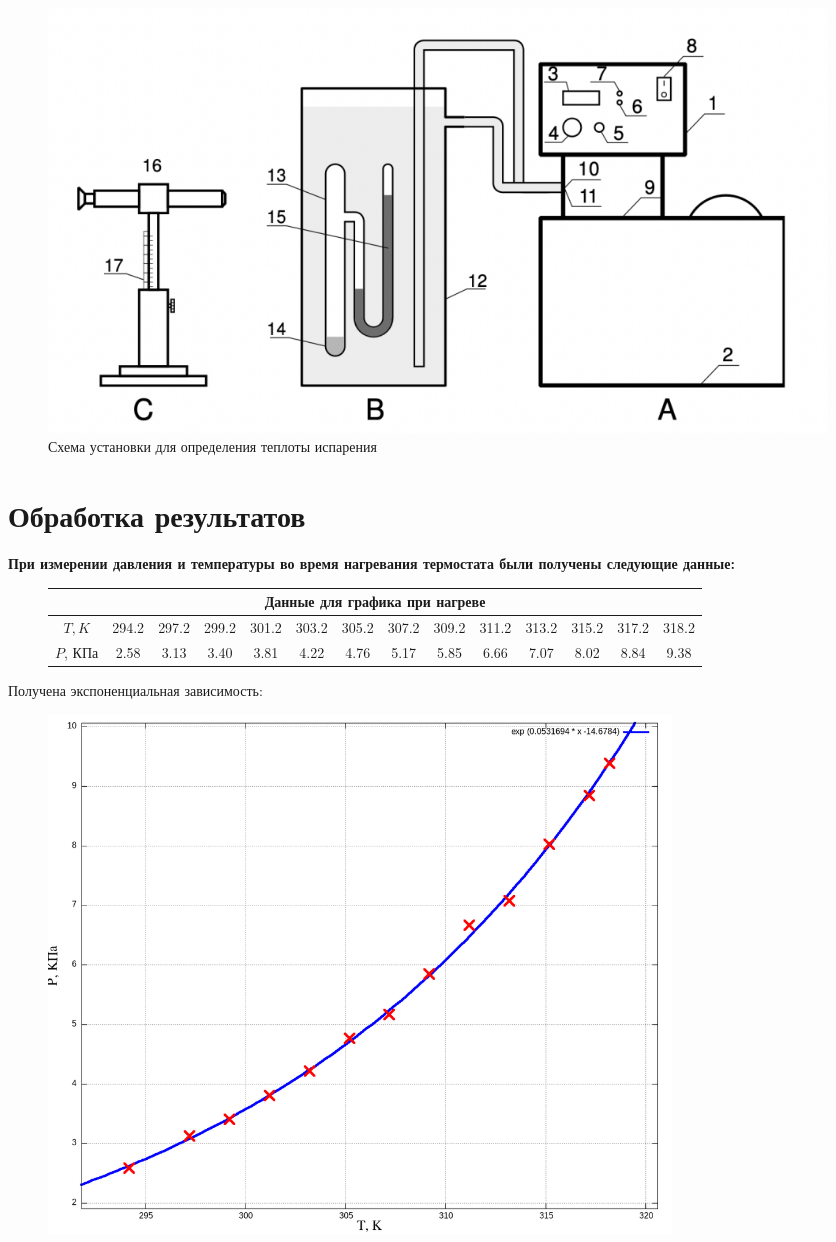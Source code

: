 \documentclass[a4paper,10pt]{article} %
\begin{document}
\begin{figure}[H]
	\centering
	\includegraphics[scale=0.8]{Picture1}
	\caption{Схема установки для определения теплоты испарения}
\end{figure}

	
\section {Обработка результатов}
\textbf{При измерении давления и температуры во время нагревания термостата были получены следующие данные:}

\begin{figure}[H]
\begin{tabular}{|c|c|c|c|c|c|c|c|c|c|c|c|c|c|}
\hline
\multicolumn{14}{|c|}{Данные для графика при нагреве}\\
\hline
$T, K$&294.2&297.2&299.2&301.2&303.2&305.2&307.2&309.2&311.2&313.2&315.2&317.2&318.2\\\hline
$P$, КПа&2.58&3.13&3.40&3.81&4.22&4.76&5.17&5.85&6.66&7.07&8.02&8.84&9.38\\\hline
\end{tabular}
\end{figure}

Получена экспоненциальная зависимость:


\begin{figure}[H]
	\centering
	\includegraphics[width=0.8\textwidth]{2-4-1-1-res.png}
\end{figure}
\end{document}
